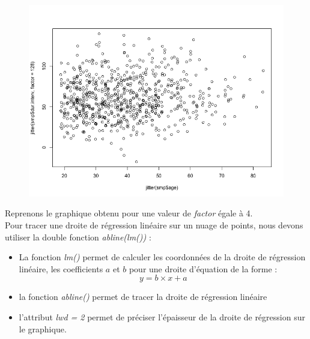\begin{figure}[H]\begin{center}\includegraphics[scale=0.35]{ilu/cr.png}\end{center}\end{figure}
Reprenons le graphique obtenu pour une valeur de \textit{factor} égale à 4.\newline
\\
Pour tracer une droite de régression linéaire sur un nuage de points, nous devons utiliser la double fonction \textit{abline(lm())} : 
\begin{itemize}
\item La fonction \textit{lm()} permet de calculer les coordonnées de la droite de régression linéaire, les coefficients $a$ et $b$ pour une droite d'équation de la forme : 
$$y= b\times x + a$$
\item la fonction \textit{abline()} permet de tracer la droite de régression linéaire 
\item l'attribut \textit{lwd = 2} permet de préciser l'épaisseur de la droite de régression sur le graphique.
\end{itemize}

